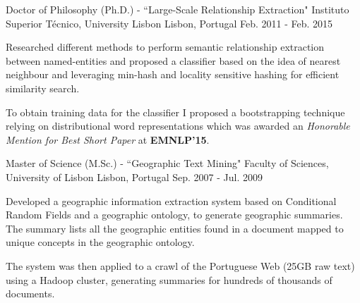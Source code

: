 

\begin{cventries}

  \cventry
    {Doctor of Philosophy (Ph.D.) - ``Large-Scale Relationship Extraction"} %
	{Instituto Superior Técnico, University Lisbon} %
    {Lisbon, Portugal} %
    {Feb. 2011 - Feb. 2015} %
    {
      \begin{cvitems} %
        \item {Researched different methods to perform semantic relationship extraction between named-entities and proposed a classifier based on the idea of nearest neighbour and leveraging min-hash and locality sensitive hashing for efficient similarity search.}
		\item {To obtain training data for the classifier I proposed a bootstrapping technique relying on distributional word representations which was awarded an {\it Honorable Mention for Best Short Paper} at \textbf{EMNLP'15}.}
      \end{cvitems}
    }


  \cventry
    {Master of Science (M.Sc.) - ``Geographic Text Mining"} %
	{Faculty of Sciences, University of Lisbon} %
    {Lisbon, Portugal} %
    {Sep. 2007 - Jul. 2009} %
    {
      \begin{cvitems} %
        \item {Developed a geographic information extraction system based on Conditional Random Fields and a geographic ontology, to generate geographic summaries. The summary lists all the geographic entities found in a document mapped to unique concepts in the geographic ontology.}
		\item {The system was then applied to a crawl of the Portuguese Web (25GB raw text) using a Hadoop cluster, generating summaries for hundreds of thousands of documents.}
      \end{cvitems}
    }


\end{cventries}

